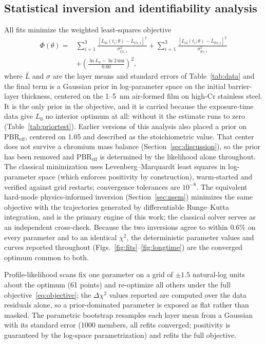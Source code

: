 \documentclass[preprint,12pt]{elsarticle}
\begin{document}
\subsection{Statistical inversion and identifiability analysis}\label{sec:stats}

All fits minimize the weighted least-squares objective
\begin{equation}
\begin{split}
\Phi(\theta) = {}&
\sum_{i=1}^{3} \frac{\left[L_\text{bl}(t_i;\theta) - \bar{L}_{\text{Cr},i}\right]^2}{\sigma_{\text{Cr},i}^2}
+ \sum_{i=1}^{3} \frac{\left[L_\text{ol}(t_i;\theta) - \bar{L}_{\text{Fe},i}\right]^2}{\sigma_{\text{Fe},i}^2} \\
&+ \left(\frac{\ln L_0 - \ln 2\,\text{nm}}{0.60}\right)^{\!2},
\end{split}
\label{eq:objective}
\end{equation}
where $\bar{L}$ and $\sigma$ are the layer means and standard errors of
Table~\ref{tab:data} and the final term is a Gaussian prior in
log-parameter space on the initial barrier-layer thickness, centered on
the 1--5~nm air-formed film on high-Cr stainless steel. It is the only
prior in the objective, and it is carried because the exposure-time data
give $L_0$ no interior optimum at all: without it the estimate runs to
zero (Table~\ref{tab:priortest}). Earlier versions of this analysis also
placed a prior on $\mathrm{PBR}_\text{eff}$, centered on 1.05 and
described as the stoichiometric value. That center does not survive a
chromium mass balance (Section~\ref{sec:discussion}), so the prior has
been removed and $\mathrm{PBR}_\text{eff}$ is determined by the
likelihood alone throughout. The classical minimization
uses Levenberg--Marquardt least squares in log-parameter space (which
enforces positivity by construction), warm-started and verified against
grid restarts; convergence tolerances are $10^{-8}$. The equivalent
hard-mode physics-informed inversion (Section~\ref{sec:nsem}) minimizes
the same objective with the trajectories generated by differentiable
Runge--Kutta integration, and is the primary engine of this work; the
classical solver serves as an independent cross-check. Because the two
inversions agree to within 0.6\% on every parameter and to an identical
$\chi^2$, the deterministic parameter values and curves reported
throughout (Figs.~\ref{fig:fits}--\ref{fig:longtime}) are the converged
optimum common to both.

Profile-likelihood scans fix one parameter on a grid of $\pm1.5$
natural-log units about the optimum (61 points) and re-optimize all
others under the full objective~\eqref{eq:objective}; the
$\Delta\chi^2$ values reported are computed over the data residuals
alone, so a prior-dominated parameter is exposed as flat rather than
masked. The parametric bootstrap resamples each layer mean from a
Gaussian with its standard error (1000 members, all refits converged;
positivity is guaranteed by the log-space parametrization) and refits
the full objective.
\end{document}
